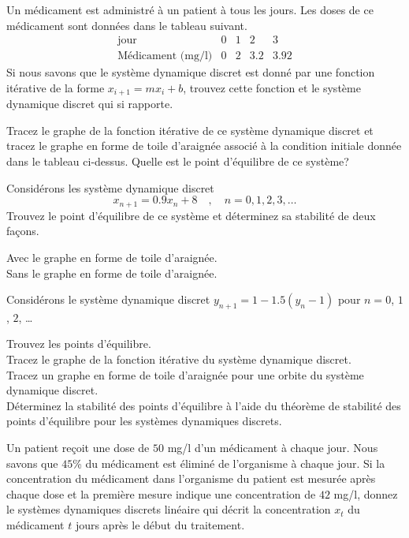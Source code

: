 \begin{question}[\life]
Un médicament est administré à un patient à tous les jours.  Les doses
de ce médicament sont données dans le tableau suivant.
\[
\begin{array}{l|c|c|c|c}
\text{jour} & 0 & 1 & 2 & 3 \\
\hline
\text{Médicament (mg/l)} & 0 & 2 & 3.2 & 3.92
\end{array}
\]
Si nous savons que le système dynamique discret est donné par une fonction
itérative de la forme $x_{i+1} = m x_i + b$, trouvez cette fonction et
le système dynamique discret qui si rapporte.

Tracez le graphe de la fonction itérative de ce système dynamique
discret et tracez le graphe en forme de toile d'araignée associé à
la condition initiale donnée dans le tableau ci-dessus.  Quelle est le
point d'équilibre de ce système?
\label{6Q87}
\end{question}

\begin{question}[\life]
Considérons les système dynamique discret
\[
x_{n+1} = 0.9 x_n + 8 \quad , \quad n=0, 1, 2, 3, \ldots
\]
Trouvez le point d'équilibre de ce système et déterminez sa stabilité de deux
façons.

 Avec le graphe en forme de toile d'araignée.\\
 Sans le graphe en forme de toile d'araignée.
\label{6Q88}
\end{question}

\begin{question}[\life]
Considérons le système dynamique discret $y_{n+1} = 1 -1.5(y_n-1)$
pour $n=0$, $1$, $2$, \ldots

 Trouvez les points d'équilibre.\\
 Tracez le graphe de la fonction itérative du système dynamique
discret.\\
 Tracez un graphe en forme de toile d'araignée pour une orbite du
système dynamique discret.\\
 Déterminez la stabilité des points d'équilibre à l'aide du théorème
de stabilité des points d'équilibre pour les systèmes dynamiques
discrets.
\label{6Q89}
\end{question}

\begin{question}[\life]
Un patient reçoit une dose de $50$ mg/l d'un médicament à chaque jour.
Nous savons que $45$\% du médicament est éliminé de l'organisme à chaque
jour.  Si la concentration du médicament dans l'organisme du
patient est mesurée après chaque dose et la première mesure indique une
concentration de $42$ mg/l, donnez le systèmes dynamiques discrets
linéaire qui décrit la concentration $x_t$ du médicament $t$ jours
après le début du traitement.
\label{6Q90}
\end{question}


